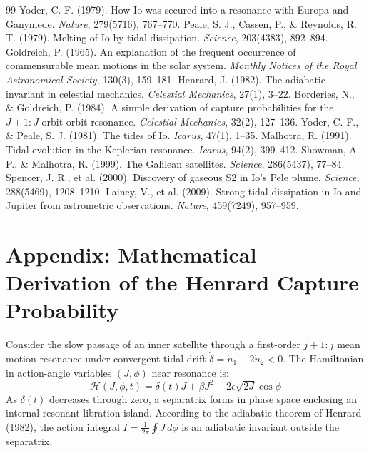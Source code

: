 \documentclass[11pt,a4paper]{article}
\begin{document}
\begin{thebibliography}{99}
 Yoder, C. F. (1979). How Io was secured into a resonance with Europa and Ganymede. \emph{Nature}, 279(5716), 767--770.
 Peale, S. J., Cassen, P., \& Reynolds, R. T. (1979). Melting of Io by tidal dissipation. \emph{Science}, 203(4383), 892--894.
 Goldreich, P. (1965). An explanation of the frequent occurrence of commensurable mean motions in the solar system. \emph{Monthly Notices of the Royal Astronomical Society}, 130(3), 159--181.
 Henrard, J. (1982). The adiabatic invariant in celestial mechanics. \emph{Celestial Mechanics}, 27(1), 3--22.
 Borderies, N., \& Goldreich, P. (1984). A simple derivation of capture probabilities for the $J+1:J$ orbit-orbit resonance. \emph{Celestial Mechanics}, 32(2), 127--136.
 Yoder, C. F., \& Peale, S. J. (1981). The tides of Io. \emph{Icarus}, 47(1), 1--35.
 Malhotra, R. (1991). Tidal evolution in the Keplerian resonance. \emph{Icarus}, 94(2), 399--412.
 Showman, A. P., \& Malhotra, R. (1999). The Galilean satellites. \emph{Science}, 286(5437), 77--84.
 Spencer, J. R., et al. (2000). Discovery of gaseous S2 in Io's Pele plume. \emph{Science}, 288(5469), 1208--1210.
 Lainey, V., et al. (2009). Strong tidal dissipation in Io and Jupiter from astrometric observations. \emph{Nature}, 459(7249), 957--959.
\end{thebibliography}

\appendix
\section{Appendix: Mathematical Derivation of the Henrard Capture Probability}
Consider the slow passage of an inner satellite through a first-order $j+1:j$ mean motion resonance under convergent tidal drift $\dot{\delta} = \dot{n}_1 - 2\dot{n}_2 < 0$. The Hamiltonian in action-angle variables $(J, \phi)$ near resonance is:
\begin{equation}
\mathcal{H}(J, \phi, t) = \delta(t) J + \beta J^2 - 2\epsilon \sqrt{2J} \cos\phi
\end{equation}
As $\delta(t)$ decreases through zero, a separatrix forms in phase space enclosing an internal resonant libration island. According to the adiabatic theorem of Henrard (1982), the action integral $I = \frac{1}{2\pi} \oint J \, d\phi$ is an adiabatic invariant outside the separatrix.
\end{document}
